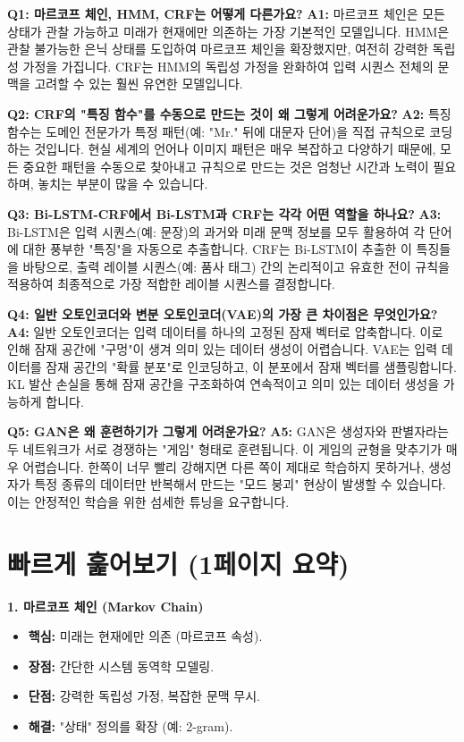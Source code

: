 \documentclass[11pt,a4paper]{article}
\begin{document}
\begin{tcolorbox}[conceptbox, title=Q\&A: 초심자를 위한 핵심 질문]
\textbf{Q1: 마르코프 체인, HMM, CRF는 어떻게 다른가요?}
\textbf{A1:} 마르코프 체인은 모든 상태가 관찰 가능하고 미래가 현재에만 의존하는 가장 기본적인 모델입니다. HMM은 관찰 불가능한 은닉 상태를 도입하여 마르코프 체인을 확장했지만, 여전히 강력한 독립성 가정을 가집니다. CRF는 HMM의 독립성 가정을 완화하여 입력 시퀀스 전체의 문맥을 고려할 수 있는 훨씬 유연한 모델입니다.

\textbf{Q2: CRF의 "특징 함수"를 수동으로 만드는 것이 왜 그렇게 어려운가요?}
\textbf{A2:} 특징 함수는 도메인 전문가가 특정 패턴(예: "Mr." 뒤에 대문자 단어)을 직접 규칙으로 코딩하는 것입니다. 현실 세계의 언어나 이미지 패턴은 매우 복잡하고 다양하기 때문에, 모든 중요한 패턴을 수동으로 찾아내고 규칙으로 만드는 것은 엄청난 시간과 노력이 필요하며, 놓치는 부분이 많을 수 있습니다.

\textbf{Q3: Bi-LSTM-CRF에서 Bi-LSTM과 CRF는 각각 어떤 역할을 하나요?}
\textbf{A3:} Bi-LSTM은 입력 시퀀스(예: 문장)의 과거와 미래 문맥 정보를 모두 활용하여 각 단어에 대한 풍부한 "특징"을 자동으로 추출합니다. CRF는 Bi-LSTM이 추출한 이 특징들을 바탕으로, 출력 레이블 시퀀스(예: 품사 태그) 간의 논리적이고 유효한 전이 규칙을 적용하여 최종적으로 가장 적합한 레이블 시퀀스를 결정합니다.

\textbf{Q4: 일반 오토인코더와 변분 오토인코더(VAE)의 가장 큰 차이점은 무엇인가요?}
\textbf{A4:} 일반 오토인코더는 입력 데이터를 하나의 고정된 잠재 벡터로 압축합니다. 이로 인해 잠재 공간에 "구멍"이 생겨 의미 있는 데이터 생성이 어렵습니다. VAE는 입력 데이터를 잠재 공간의 "확률 분포"로 인코딩하고, 이 분포에서 잠재 벡터를 샘플링합니다. KL 발산 손실을 통해 잠재 공간을 구조화하여 연속적이고 의미 있는 데이터 생성을 가능하게 합니다.

\textbf{Q5: GAN은 왜 훈련하기가 그렇게 어려운가요?}
\textbf{A5:} GAN은 생성자와 판별자라는 두 네트워크가 서로 경쟁하는 "게임" 형태로 훈련됩니다. 이 게임의 균형을 맞추기가 매우 어렵습니다. 한쪽이 너무 빨리 강해지면 다른 쪽이 제대로 학습하지 못하거나, 생성자가 특정 종류의 데이터만 반복해서 만드는 "모드 붕괴" 현상이 발생할 수 있습니다. 이는 안정적인 학습을 위한 섬세한 튜닝을 요구합니다.
\end{tcolorbox}

\newpage
\section*{빠르게 훑어보기 (1페이지 요약)}

\begin{tcolorbox}[summarybox, title=핵심 개념 요약]
\textbf{1. 마르코프 체인 (Markov Chain)}
\begin{itemize}
    \item \textbf{핵심:} 미래는 현재에만 의존 (마르코프 속성).
    \item \textbf{장점:} 간단한 시스템 동역학 모델링.
    \item \textbf{단점:} 강력한 독립성 가정, 복잡한 문맥 무시.
    \item \textbf{해결:} "상태" 정의를 확장 (예: 2-gram).
\end{itemize}
\end{tcolorbox}
\end{document}
